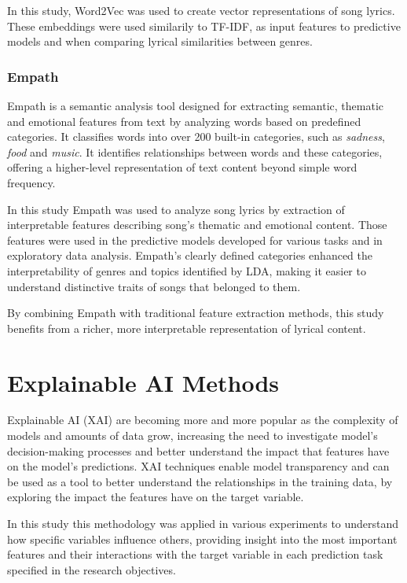 In this study, Word2Vec was used to create vector representations of song
lyrics. These embeddings  were used similarily to TF-IDF, as input features
to predictive models and when comparing lyrical similarities between genres.



\subsubsection*{Empath}
Empath is a semantic analysis tool designed for extracting
semantic, thematic and emotional features from text by analyzing words based on
predefined categories. It classifies words into over 200 built-in categories,
such as \textit{sadness}, \textit{food} and \textit{music}. It  identifies
relationships between words and these categories, offering a higher-level
representation of text content beyond simple word frequency.\cite{empath}

In this study Empath was used to analyze song lyrics by extraction of 
interpretable features describing song's thematic and emotional content.
Those features were used in the predictive models developed for various
tasks and in exploratory data analysis. Empath's clearly defined  categories 
enhanced the interpretability of genres and topics identified by LDA, 
making it easier to understand distinctive traits of songs that belonged to
them.

By combining Empath with traditional feature extraction methods, this study
benefits from a richer, more interpretable representation of lyrical content.


\section{Explainable AI Methods}
\label{sec:explainableaimethods}

Explainable AI (XAI) are becoming more and more popular as the complexity of
models and amounts of data grow, increasing the need to investigate model's
decision-making processes and better understand the impact that features have
on the model's predictions. XAI techniques enable model  transparency and can
be used as a  tool to better understand the relationships in the training data,
by exploring the impact the features have on the target variable. 

In this study this methodology was applied in various experiments to understand
how specific variables influence others, providing insight into the most
important features and their interactions with the target variable in each
prediction task specified in the research objectives.




